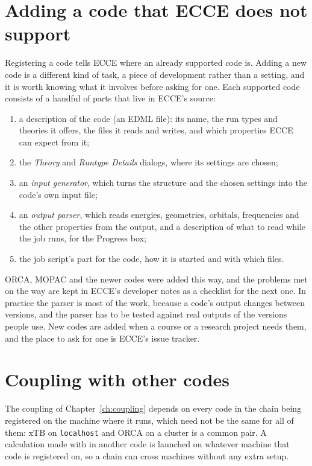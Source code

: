 \section{Adding a code that ECCE does not support}
Registering a code tells ECCE where an already supported code is. Adding a new code is a different kind of task, a piece of development rather than a setting, and it is worth knowing what it involves before asking for one. Each supported code consists of a handful of parts that live in ECCE's source:
\begin{enumerate}
	\item a description of the code (an EDML file): its name, the run types and theories it offers, the files it reads and writes, and which properties ECCE can expect from it;
	\item the \emph{Theory} and \emph{Runtype Details} dialogs, where its settings are chosen;
	\item an \emph{input generator}, which turns the structure and the chosen settings into the code's own input file;
	\item an \emph{output parser}, which reads energies, geometries, orbitals, frequencies and the other properties from the output, and a description of what to read while the job runs, for the Progress box;
	\item the job script's part for the code, how it is started and with which files.
\end{enumerate}
ORCA, MOPAC and the newer codes were added this way, and the problems met on the way are kept in ECCE's developer notes as a checklist for the next one. In practice the parser is most of the work, because a code's output changes between versions, and the parser has to be tested against real outputs of the versions people use. New codes are added when a course or a research project needs them, and the place to ask for one is ECCE's issue tracker.

\section{Coupling with other codes}
The coupling of Chapter~\ref{ch:coupling} depends on every code in the chain being registered on the machine where it runs, which need not be the same for all of them: xTB on \texttt{localhost} and ORCA on a cluster is a common pair. A calculation made with  in another code is launched on whatever machine that code is registered on, so a chain can cross machines without any extra setup.
